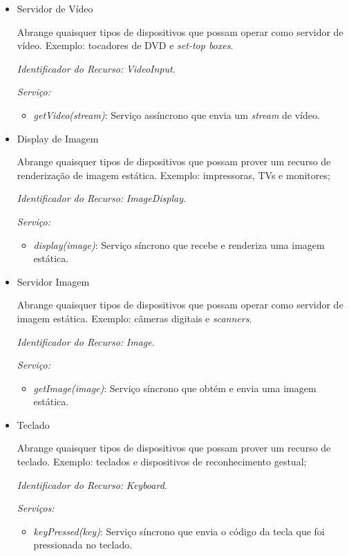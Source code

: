 \begin{itemize}
	\item Servidor de Vídeo
		
		Abrange quaisquer tipos de dispositivos que possam operar como servidor de vídeo. Exemplo: tocadores de DVD e \emph{set-top boxes}.

		\emph{Identificador do Recurso:} \emph{VideoInput}.

		\emph{Serviço:}
		\begin{itemize}
			\item \emph{getVideo(stream)}: Serviço assíncrono que envia um \emph{stream} de vídeo.
		\end{itemize}

	\item Display de Imagem
		
		Abrange quaisquer tipos de dispositivos que possam prover um recurso de renderização de imagem estática. Exemplo: impressoras, TVs e monitores;

		\emph{Identificador do Recurso:} \emph{ImageDisplay}.

		\emph{Serviço:}
		\begin{itemize}
			\item \emph{display(image)}: Serviço síncrono que recebe e renderiza uma imagem estática.
		\end{itemize}

	\item Servidor Imagem
		
		Abrange quaisquer tipos de dispositivos que possam operar como servidor de imagem estática. Exemplo: câmeras digitais e \emph{scanners}.

		\emph{Identificador do Recurso:} \emph{Image}.

		\emph{Serviço:} 
		\begin{itemize}
			\item \emph{getImage(image)}: Serviço síncrono que obtém e envia uma imagem estática.
		\end{itemize}
	\item Teclado
		
		Abrange quaisquer tipos de dispositivos que possam prover um recurso de teclado. Exemplo: teclados e dispositivos de reconhecimento gestual;

		\emph{Identificador do Recurso:} \emph{Keyboard}.

		\emph{Serviços:}
		\begin{itemize}
			\item \emph{keyPressed(key)}: Serviço síncrono que envia o código da tecla que foi pressionada no teclado.


\end{itemize}
\end{itemize}
